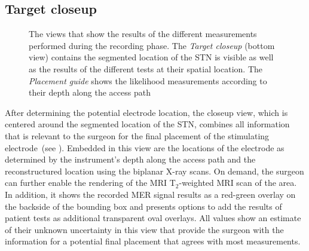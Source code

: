 \subsection{Target closeup} \label{contributions:dbs:target}
\begin{figure}
\caption{The views that show the results of the different measurements performed during the recording phase. The \emph{Target closeup} (bottom view) contains the segmented location of the STN is visible as well as the results of the different tests at their spatial location.  The \emph{Placement guide} shows the likelihood measurements according to their depth along the access path}
\label{contributions:dbs:target}
\end{figure}

After determining the potential electrode location, the closeup view, which is centered around the segmented location of the STN, combines all information that is relevant to the surgeon for the final placement of the stimulating electrode~(see ).  Embedded in this view are the locations of the electrode as determined by the instrument's depth along the access path and the reconstructured location using the biplanar X-ray scans.  On demand, the surgeon can further enable the rendering of the MRI T$_2$-weighted MRI scan of the area.  In addition, it shows the recorded MER signal results as a red-green overlay on the backside of the bounding box and presents options to add the results of patient tests as additional transparent oval overlays.  All values show an estimate of their unknown uncertainty in this view that provide the surgeon with the information for a potential final placement that agrees with most measurements.


